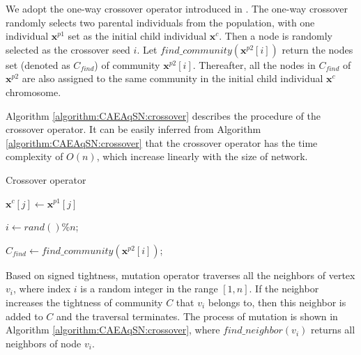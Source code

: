 \documentclass[10pt, journal]{IEEEtran}
\begin{document}
We adopt the one-way crossover operator introduced in \cite{tasgin2007community}.
The one-way crossover randomly selects two parental individuals from the population, with one individual $\textbf{x}^{p1}$ set as the initial child individual $\textbf{x}^c$. Then a node is randomly selected as the crossover seed $i$. Let $find\_community(\textbf{x}^{p2}[i])$ return the nodes set (denoted as $C_{find}$) of community $\textbf{x}^{p2}[i]$. Thereafter, all the
nodes in $C_{find}$ of $\textbf{x}^{p2}$ are also assigned to the same community in the initial child individual $\textbf{x}^c$ chromosome.

Algorithm \ref{algorithm:CAEAqSN:crossover} describes the procedure of the crossover operator. It can be easily inferred from Algorithm \ref{algorithm:CAEAqSN:crossover} that the crossover operator has the time complexity of $O(n)$, which increase linearly with the size of network.

\begin{algorithm}[!htbp]
	\caption{Crossover operator} \label{algorithm:CAEAqSN:crossover}
	

	{\label{code:InitializeDirection:calcNeighbor:begin}
		
		{$\textbf{x}^c[j] \leftarrow \textbf{x}^{p1}[j] $}\;
	}\label{code:InitializeDirection:calcNeighbor:end}

    {$i\leftarrow rand() \% n $;}

    {$C_{find} \leftarrow find\_community(\textbf{x}^{p2}[i]) $;}


    {}
\end{algorithm}



Based on signed tightness, mutation operator traverses all the neighbors of vertex $v_i$, where index $i$ is a random integer in the range $[1,n]$. If the neighbor increases the tightness of community $C$ that $v_i$ belongs to, then this neighbor is added to $C$ and the traversal terminates. The process of mutation is shown in Algorithm \ref{algorithm:CAEAqSN:crossover}, where $find\_neighbor(v_i)$ returns all neighbors of node $v_i$.
\end{document}
